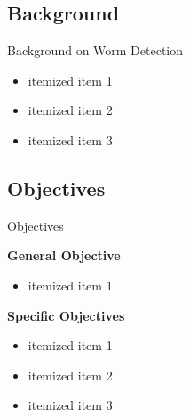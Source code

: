 \documentclass{beamer}
\begin{document}
\subsection{Background}
\begin{frame}{Background on Worm Detection}

\begin{itemize}
  \item itemized item 1 
  \item itemized item 2 
  \item itemized item 3
\end{itemize}

\end{frame}

\subsection{Objectives}
\begin{frame}{Objectives}

\large \textbf{General Objective}\\
\vskip7pt

\begin{itemize}
  \item itemized item 1 \pause 
\end{itemize}

\vskip7pt
\pause \large \textbf{Specific Objectives}\\
\vskip7pt

\begin{itemize}
  \item itemized item 1 \pause 
  \item itemized item 2 \pause
  \item itemized item 3
\end{itemize}

\end{frame}
\end{document}
